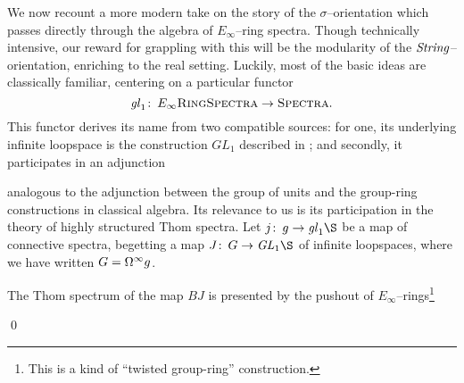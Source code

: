 We now recount a more modern take on the story of the $\sigma$--orientation which passes directly through the algebra of $E_\infty$--ring spectra.  Though technically intensive, our reward for grappling with this will be the modularity of the $\mathit{String}$--orientation, enriching  to the real setting.  Luckily, most of the basic ideas are classically familiar, centering on a particular functor \[\mathit{gl}_1\colon\thinspace E_\infty\normalfont\textsc{RingSpectra} \to \normalfont\textsc{Spectra}.\]  This functor derives its name from two compatible sources: for one, its underlying infinite loopspace is the construction $GL_1$ described in ; and secondly, it participates in an adjunction
\begin{center}
\end{center}
analogous to the adjunction between the group of units and the group-ring constructions in classical algebra.  Its relevance to us is its participation in the theory of highly structured Thom spectra.  Let $j\co g \to \gl_1 \S$ be a map of connective spectra, begetting a map $J\co G \to \GL_1 \S$ of infinite loopspaces, where we have written $G = \Omega^\infty g$.
\begin{lemma}
The Thom spectrum of the map $BJ$ is presented by the pushout of $E_\infty$--rings\footnote{This is a kind of ``twisted group-ring'' construction.}
\begin{center}
\end{center}
\qed
\end{lemma}

